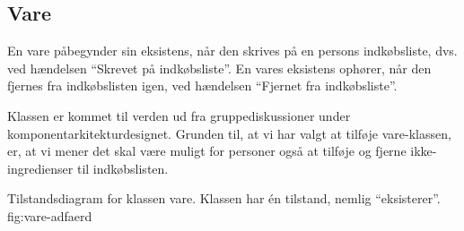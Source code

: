 \subsection{Vare}
En vare påbegynder sin eksistens, når den skrives på en persons indkøbsliste, dvs. ved hændelsen ``Skrevet på indkøbsliste''. En vares eksistens ophører, når den fjernes fra indkøbslisten igen, ved hændelsen ``Fjernet fra indkøbsliste''.

Klassen er kommet til verden ud fra gruppediskussioner under komponentarkitekturdesignet. Grunden til, at vi har valgt at tilføje vare-klassen, er, at vi mener det skal være muligt for personer også at tilføje og fjerne ikke-ingredienser til indkøbslisten.  

  {Tilstandsdiagram for klassen vare. Klassen har én tilstand, nemlig ``eksisterer''.}
  {fig:vare-adfaerd}
  

